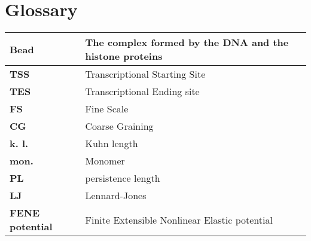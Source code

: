 \section{Glossary} \label{chap: term explanation}

\begin{table}[H]
\begin{tabular}{|l|l|}
\hline
\textbf{Bead} & The complex formed by the DNA and the histone proteins \\
\hline
\textbf{TSS} & Transcriptional Starting Site \\
\hline
\textbf{TES} & Transcriptional Ending site \\
\hline
\textbf{FS} & Fine Scale \\
\hline
\textbf{CG} & Coarse Graining \\
\hline
\textbf{k. l.} & Kuhn length\\
\hline
\textbf{mon.} & Monomer\\
\hline
\textbf{PL} & persistence length\\
\hline
\textbf{LJ} & Lennard-Jones\\
\hline
\textbf{FENE potential} & Finite Extensible Nonlinear Elastic potential\\
\hline
\end{tabular}
\end{table}